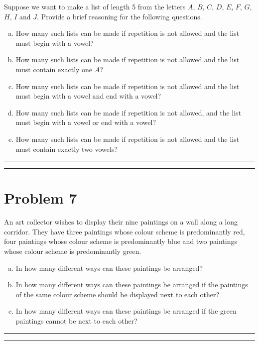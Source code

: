 \documentclass{article}
\theoremstyle{definition}
\newenvironment{solution}{\bigskip\hrule{\hfill}}{\bigskip\hrule{\hfill}} %
\begin{document}
Suppose we want to make a list of length 5 from the letters $A$, $B$, $C$, $D$, $E$, $F$, $G$, $H$, $I$ and  $J$. Provide a brief reasoning for the following questions.
    \begin{enumerate}[a)] %
        \item How many such lists can be made if repetition is not allowed and the list must begin with a vowel?
        \item How many such lists can be made if repetition is not allowed and the list must contain exactly one $A$?
        \item How many such lists can be made if repetition is not allowed and the list must begin with a vowel and end with a vowel?
        \item How many such lists can be made if repetition is not allowed, and the list must begin with a vowel or end with a vowel?
        \item How many such lists can be made if repetition is not allowed and the list must contain exactly two vowels?
    \end{enumerate}

\begin{solution}


\end{solution}


\newpage


\section*{Problem 7}

An art collector wishes to display their nine paintings on a wall along a long corridor. They have three paintings whose colour scheme is predominantly red, four paintings whose colour scheme is predominantly blue and two paintings whose colour scheme is predominantly green.
    \begin{enumerate}[a)] %
        \item In how many different ways can these paintings be arranged?
        \item In how many different ways can these paintings be arranged if the paintings of the same colour scheme should be displayed next to each other?
        \item In how many different ways can these paintings be arranged if the green paintings cannot be next to each other?
    \end{enumerate}

\begin{solution}


\end{solution}

\end{document}
